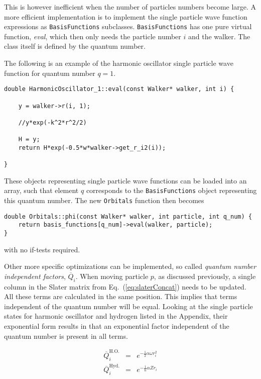 This is however inefficient when the number of particles numbers become large. A more efficient implementation is to implement the single particle wave function expressions as \verb+BasisFunctions+ subclasses. \verb+BasisFunctions+ has one pure virtual function, \textit{eval}, which then only needs the particle number $i$ and the walker. The class itself is defined by the quantum number. 

The following is an example of the harmonic oscillator single particle wave function for quantum number $q=1$.

\begin{lstlisting}
double HarmonicOscillator_1::eval(const Walker* walker, int i) {

    y = walker->r(i, 1);
    
    //y*exp(-k^2*r^2/2)
    
    H = y;
    return H*exp(-0.5*w*walker->get_r_i2(i));
    
}
\end{lstlisting}

These objects representing single particle wave functions can be loaded into an array, such that element $q$ corresponds to the \verb+BasisFunctions+ object representing this quantum number. The new \verb+Orbitals+ function then becomes

\begin{lstlisting}
double Orbitals::phi(const Walker* walker, int particle, int q_num) {
    return basis_functions[q_num]->eval(walker, particle);
}
\end{lstlisting}

with no if-tests required.

Other more specific optimizations can be implemented, so called \textit{quantum number independent factors}, $\overline{Q}_i$. When moving particle $p$, as discussed previously, a single column in the Slater matrix from Eq.~(\ref{eq:slaterConcat}) needs to be updated. All these terms are calculated in the same position. This implies that terms independent of the quantum number will be equal. Looking at the single particle states for harmonic oscillator and hydrogen listed in the Appendix, their exponential form results in that an exponential factor independent of the quantum number is present in all terms.

\begin{eqnarray}
\overline{Q}_i^\mathrm{H.O.} &=& e^{-\frac{1}{2}\alpha\omega r_i^2} \\
 \overline{Q}_i^\mathrm{Hyd.} &=& e^{-\frac{1}{n}\alpha Z r_i}
\end{eqnarray}

